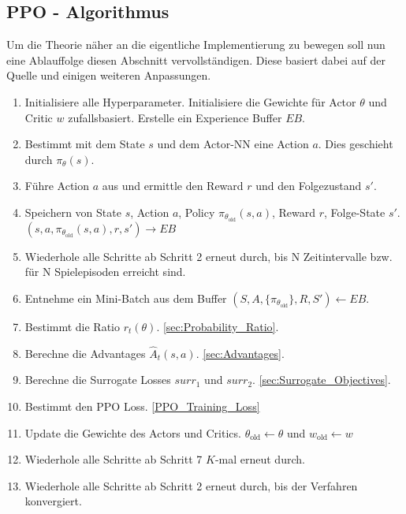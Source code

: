 \subsection{PPO - Algorithmus}
Um die Theorie näher an die eigentliche Implementierung zu bewegen soll nun eine Ablauffolge diesen Abschnitt vervollständigen. Diese basiert dabei auf der Quelle \cite{PPO} und einigen weiteren Anpassungen.
\begin{enumerate}
	\item Initialisiere alle Hyperparameter. Initialisiere die Gewichte für Actor $\theta$ und Critic $w$ zufallsbasiert. Erstelle ein Experience Buffer $EB$.
	\item Bestimmt mit dem State $s$ und dem Actor-NN eine Action $a$. Dies geschieht durch $\pi_{\theta}(s)$.
	\item Führe Action $a$ aus und ermittle den Reward $r$ und den Folgezustand $s'$.
	\item Speichern von State $s$, Action $a$, Policy $\pi_{\theta_{\text{old}}}(s,a)$, Reward $r$, Folge-State $s'$. $(s,a, \pi_{\theta_{\text{old}}}(s,a),r,s') \longrightarrow EB$
	\item Wiederhole alle Schritte ab Schritt 2 erneut durch, bis N Zeitintervalle bzw. für N Spielepisoden erreicht sind.
	\item Entnehme ein Mini-Batch aus dem Buffer $(S,A,\{\pi_{\theta_{\text{old}}}\},R,S') \longleftarrow EB$.
	\item Bestimmt die Ratio $r_t(\theta)$. \ref{sec:Probability_Ratio}.
	\item Berechne die Advantages $\hat{A}_{t}(s, a)$. \ref{sec:Advantages}.
	\item Berechne die Surrogate Losses $surr_1$ und $surr_2$. \ref{sec:Surrogate_Objectives}.
	\item Bestimmt den PPO Loss. \ref{PPO_Training_Loss}
	\item Update die Gewichte des Actors und Critics. $\theta_{\text{old}} \longleftarrow \theta$ und $w_{\text{old}} \longleftarrow w$
	\item Wiederhole alle Schritte ab Schritt 7 $K$-mal erneut durch.
	\item Wiederhole alle Schritte ab Schritt 2 erneut durch, bis der Verfahren konvergiert.
\end{enumerate}

